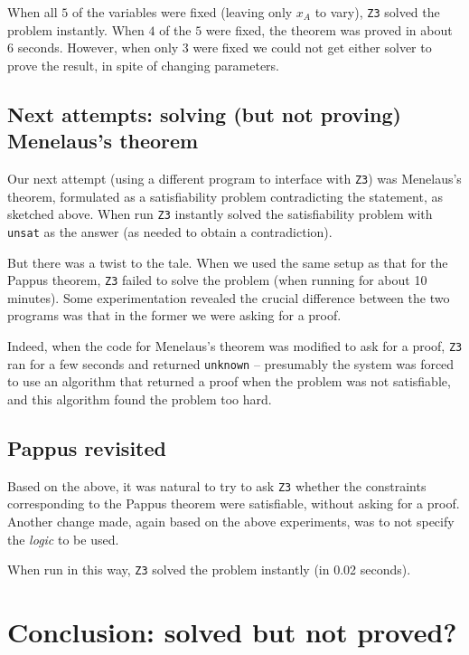 \documentclass{amsart}
\theoremstyle{plain}
\theoremstyle{definition}
\theoremstyle{remark}
\begin{document}
When all \(5\) of the variables were fixed (leaving only \(x_A\) to
vary), \texttt{Z3} solved the problem instantly. When \(4\) of the \(5\) were
fixed, the theorem was proved in about 6 seconds. However, when only
\(3\) were fixed we could not get either solver to prove the result, in
spite of changing parameters.

\subsection{Next attempts: solving (but not proving) Menelaus's theorem}

Our next attempt (using a different program to interface with \texttt{Z3}) was Menelaus's theorem,
formulated as a satisfiability problem contradicting the
statement, as sketched above. When run \texttt{Z3} instantly solved the satisfiability problem
with \texttt{unsat} as the answer (as needed to obtain a contradiction).

But there was a twist to the tale. When we used the same setup as that for the Pappus theorem,
\texttt{Z3} failed to solve the problem (when running for about 10
minutes). Some experimentation revealed the crucial difference between
the two programs was that in the former we were asking for a proof.

Indeed, when the code for Menelaus's theorem was modified to ask for a
proof, \texttt{Z3} ran for a few seconds and returned \texttt{unknown} --
presumably the system was forced to use an algorithm that returned a
proof when the problem was not satisfiable, and this algorithm found the
problem too hard.

\subsection{Pappus revisited}

Based on the above, it was natural to try to ask \texttt{Z3} whether the
constraints corresponding to the Pappus theorem were satisfiable,
without asking for a proof. Another change made, again based on the
above experiments, was to not specify the \emph{logic} to be used.

When run in this way, \texttt{Z3} solved the problem instantly (in 0.02 seconds).



\section{Conclusion: solved but not proved?}
\end{document}
